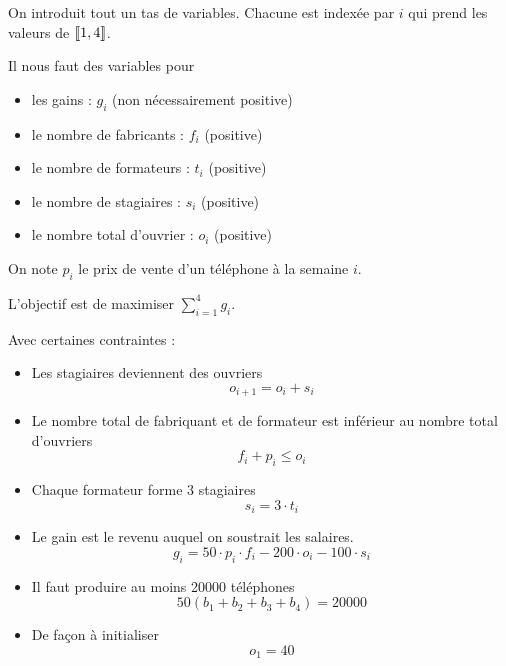 On introduit tout un tas de variables. Chacune est indexée par $i$ qui prend les valeurs de $\left\llbracket 1, 4 \right\rrbracket$.

Il nous faut des variables pour
\begin{itemize}
    \item les gains : $g_i$ (non nécessairement positive)
    \item le nombre de fabricants : $f_i$ (positive)
    \item le nombre de formateurs : $t_i$ (positive)
    \item le nombre de stagiaires : $s_i$ (positive)
    \item le nombre total d'ouvrier : $o_i$ (positive)
\end{itemize}

On note $p_i$ le prix de vente d'un téléphone à la semaine $i$.

L'objectif est de maximiser $\sum\limits_{i=1}^4 g_i$.

Avec certaines contraintes :
\begin{itemize}
    \item Les stagiaires deviennent des ouvriers
        \[
            o_{i+1} =  o_i + s_i
        \]
    \item Le nombre total de fabriquant et de formateur est inférieur au nombre total d'ouvriers
        \[
            f_i+p_i \leqslant o_i
        \]
    \item Chaque formateur forme 3 stagiaires
        \[
            s_i=3\cdot t_i        
        \]
    \item Le gain est le revenu auquel on soustrait les salaires.
        \[
            g_i = 50\cdot p_i \cdot f_i-200\cdot o_i-100\cdot s_i
        \]
    \item Il faut produire au moins 20000 téléphones
        \[
            50(b_1+b_2+b_3+b_4) = 20000
        \]
    \item De façon à initialiser
        \[
            o_1 = 40
        \]
\end{itemize}




